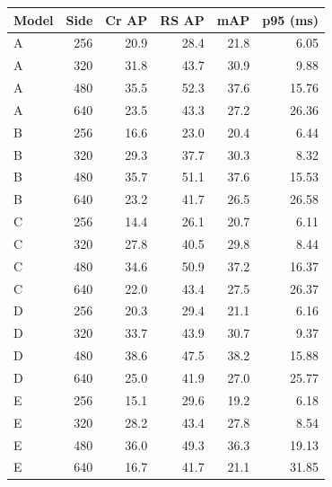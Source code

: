 \begin{tabular}{lrrrrr}
\hline
Model & Side & Cr AP & RS AP & mAP & p95 (ms) \\
\hline
A & 256 & 20.9 & 28.4 & 21.8 & 6.05 \\
A & 320 & 31.8 & 43.7 & 30.9 & 9.88 \\
A & 480 & 35.5 & 52.3 & 37.6 & 15.76 \\
A & 640 & 23.5 & 43.3 & 27.2 & 26.36 \\
B & 256 & 16.6 & 23.0 & 20.4 & 6.44 \\
B & 320 & 29.3 & 37.7 & 30.3 & 8.32 \\
B & 480 & 35.7 & 51.1 & 37.6 & 15.53 \\
B & 640 & 23.2 & 41.7 & 26.5 & 26.58 \\
C & 256 & 14.4 & 26.1 & 20.7 & 6.11 \\
C & 320 & 27.8 & 40.5 & 29.8 & 8.44 \\
C & 480 & 34.6 & 50.9 & 37.2 & 16.37 \\
C & 640 & 22.0 & 43.4 & 27.5 & 26.37 \\
D & 256 & 20.3 & 29.4 & 21.1 & 6.16 \\
D & 320 & 33.7 & 43.9 & 30.7 & 9.37 \\
D & 480 & 38.6 & 47.5 & 38.2 & 15.88 \\
D & 640 & 25.0 & 41.9 & 27.0 & 25.77 \\
E & 256 & 15.1 & 29.6 & 19.2 & 6.18 \\
E & 320 & 28.2 & 43.4 & 27.8 & 8.54 \\
E & 480 & 36.0 & 49.3 & 36.3 & 19.13 \\
E & 640 & 16.7 & 41.7 & 21.1 & 31.85 \\
\hline
\end{tabular}
